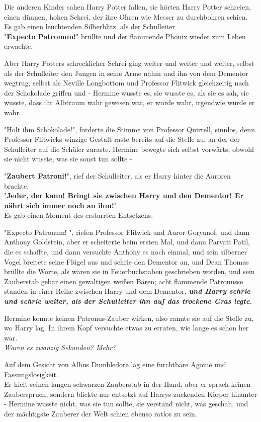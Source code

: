 {Die anderen Kinder sahen Harry Potter fallen, sie hörten Harry Potter schreien, einen dünnen, hohen Schrei, der ihre Ohren wie Messer zu durchbohren schien.\\ Es gab einen leuchtenden Silberblitz, als der Schulleiter\\ "\textbf{Expecto Patronum!}" brüllte und der flammende Phönix wieder zum Leben erwachte.

Aber Harry Potters schrecklicher Schrei ging weiter und weiter und weiter, selbst als der Schulleiter den Jungen in seine Arme nahm und ihn von dem Dementor wegtrug, selbst als Neville Longbottom und Professor Flitwick gleichzeitig nach der Schokolade griffen und - Hermine wusste es, sie wusste es, als sie es sah, sie wusste, dass ihr Albtraum wahr gewesen war, er wurde wahr, irgendwie wurde er wahr.

"Holt ihm Schokolade!", forderte die Stimme von Professor Quirrell, sinnlos, denn Professor Flitwicks winzige Gestalt raste bereits auf die Stelle zu, an der der Schulleiter auf die Schüler zuraste. Hermine bewegte sich selbst vorwärts, obwohl sie nicht wusste, was sie sonst tun sollte -

"\textbf{Zaubert Patroni!}", rief der Schulleiter, als er Harry hinter die Auroren brachte.\\ "\textbf{Jeder, der kann! Bringt sie zwischen Harry und den Dementor! Er nährt sich immer noch an ihm!}"\\ Es gab einen Moment des erstarrten Entsetzens.

"Expecto Patronum! ", riefen Professor Flitwick und Auror Goryanof, und dann Anthony Goldstein, aber er scheiterte beim ersten Mal, und dann Parvati Patil, die es schaffte, und dann versuchte Anthony es noch einmal, und sein silberner Vogel breitete seine Flügel aus und schrie den Dementor an, und Dean Thomas brüllte die Worte, als wären sie in Feuerbuchstaben geschrieben worden, und sein Zauberstab gebar einen gewaltigen weißen Bären; acht flammende Patronusse standen in einer Reihe zwischen Harry und dem Dementor, \textbf{\emph{und Harry schrie und schrie weiter, als der Schulleiter ihn auf das trockene Gras legte.}}

Hermine konnte keinen Patronus-Zauber wirken, also rannte sie auf die Stelle zu, wo Harry lag. In ihrem Kopf versuchte etwas zu erraten, wie lange es schon her war.\\ \emph{Waren es zwanzig Sekunden? Mehr?}

Auf dem Gesicht von Albus Dumbledore lag eine furchtbare Agonie und Fassungslosigkeit.\\ Er hielt seinen langen schwarzen Zauberstab in der Hand, aber er sprach keinen Zauberspruch, sondern blickte nur entsetzt auf Harrys zuckenden Körper hinunter - Hermine wusste nicht, was sie tun sollte, sie verstand nicht, was geschah, und der mächtigste Zauberer der Welt schien ebenso ratlos zu sein.

}
